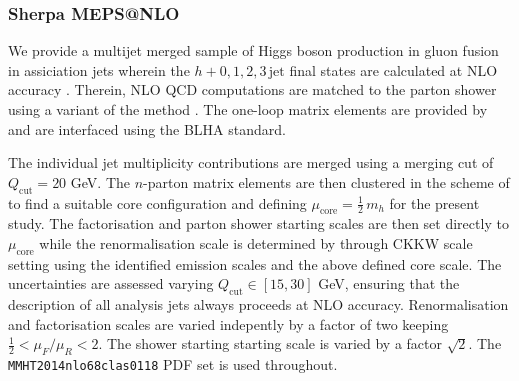 \subsubsection{Sherpa MEPS@NLO}
\label{sec:hjetscomp:tools:mc:sherpa}

We provide a multijet merged sample of Higgs boson production in 
gluon fusion in assiciation jets wherein the $h+0,1,2,3\,\text{jet}$ 
final states are calculated at NLO accuracy \cite{Gleisberg:2008ta,
  Hoeche:2012yf,Gehrmann:2012yg,Hoeche:2014lxa}. Therein, NLO QCD 
computations are matched to the parton shower using a variant of the 
\MCatNLO method \cite{Hoeche:2011fd,Hoeche:2012ft,Hoche:2012wh}.
The one-loop matrix elements are provided by \GoSam \cite{Cullen:2011ac,
  Cullen:2013saa,Greiner:2015jha} and are interfaced using the BLHA 
\cite{Alioli:2013nda} standard.

The individual jet multiplicity contributions are merged using a merging 
cut of $Q_\text{cut}=20$ GeV. The $n$-parton matrix elements are then 
clustered in the scheme of \cite{Hoeche:2009rj,Hoeche:2012yf,Gehrmann:2012yg} 
to find a suitable core configuration and defining $\mu_\text{core}
=\tfrac{1}{2}\,m_h$ for the present study. The factorisation 
and parton shower starting scales are then set directly to 
$\mu_\text{core}$ while the renormalisation scale is determined by 
through CKKW scale setting using the identified emission scales and 
the above defined core scale.
The uncertainties are assessed varying $Q_\text{cut}\in[15,30]$ GeV, 
ensuring that the description of all analysis jets always proceeds 
at NLO accuracy. Renormalisation and factorisation scales are varied 
indepently by a factor of two keeping $\tfrac{1}{2} < \mu_F/\mu_R < 2$. 
The shower starting starting scale is varied by a factor $\sqrt{2}$. 
The \texttt{MMHT2014nlo68clas0118} PDF set is used throughout.

